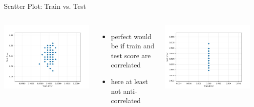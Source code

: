 \begin{frame}[c]{Scatter Plot: Train vs. Test}


\begin{columns}
	

\centering
\includegraphics[width=1\textwidth]{scripts/mlp1_test_train_scatter.jpg}

\begin{itemize}
	\item perfect would be if train and test score are correlated
	\item here at least not anti-correlated
\end{itemize}



\pause
\centering
\includegraphics[width=1\textwidth]{scripts/mlp2_test_train_scatter.jpg}
	

\end{columns}
\end{frame}
